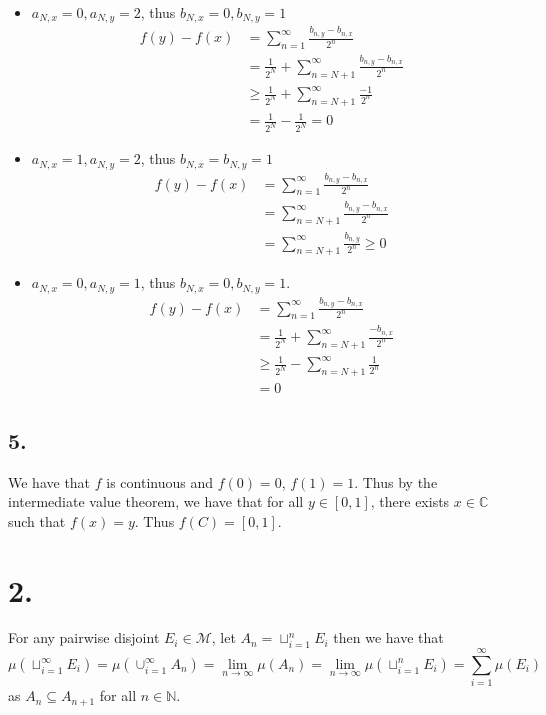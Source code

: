 \documentclass[11pt]{article}
\theoremstyle{mystyle}
\theoremstyle{definition}
\begin{document}
\begin{itemize}
  \item $a_{N,x} = 0, a_{N,y} = 2$, thus $b_{N,x} = 0 , b_{N,y} = 1$ 
    \begin{align*}
      f(y) - f(x) 
      &= \sum_{n=1}^\infty \frac{b_{n,y} - b_{n,x}}{2^n} \\
      &= \frac{1}{2^N}+\sum_{n=N+1}^\infty \frac{b_{n,y} - b_{n,x}}{2^n} \\
      &\ge \frac{1}{2^N} + \sum_{n=N+1}^\infty \frac{-1}{2^n} \\
      &= \frac{1}{2^N} - \frac{1}{2^N} = 0  
    \end{align*}
  \item $a_{N,x} = 1, a_{N,y} = 2$, thus $b_{N,x} = b_{N,y} = 1$ 
    \begin{align*}
      f(y) - f(x) 
      &= \sum_{n=1}^\infty \frac{b_{n,y} - b_{n,x}}{2^n} \\
      &= \sum_{n=N+1}^\infty \frac{b_{n,y} - b_{n,x}}{2^n} \\
      &= \sum_{n=N+1}^\infty \frac{b_{n,y}}{2^n} \ge 0
    \end{align*}
  \item $a_{N,x} = 0, a_{N,y} = 1$, thus $b_{N,x} = 0, b_{N,y} = 1$. 
    \begin{align*}
      f(y) - f(x) 
      &= \sum_{n=1}^\infty \frac{b_{n,y} - b_{n,x}}{2^n} \\
      &= \frac{1}{2^N}+\sum_{n=N+1}^\infty \frac{- b_{n,x}}{2^n} \\
      &\ge \frac{1}{2^N} - \sum_{n=N+1}^\infty \frac{1}{2^n} \\
      &= 0
    \end{align*}
\end{itemize}
\subsection*{5.}
We have that $f$ is continuous and $f(0) = 0$, $f(1) = 1$. Thus by the intermediate value theorem, we have that for all $y \in [0,1]$, there exists $x \in \mathbb{C}$ such that $f(x) = y$. Thus $f(C) = [0,1]$. 
\newpage
\section*{2.}
For any pairwise disjoint $E_i \in \mathcal{M}$, let $A_n = \sqcup_{i=1}^n E_i$ then we have that 
\[
  \mu(\sqcup_{i=1}^\infty E_i) = \mu(\cup_{i=1}^\infty A_n) = \lim_{n \to \infty}\mu(A_n) = \lim_{n \to \infty} \mu(\sqcup_{i=1}^n E_i) = \sum_{i=1}^\infty \mu(E_i) 
\]
as $A_n \subseteq A_{n+1}$ for all $n \in \mathbb{N}$. 
\newpage
\end{document}
